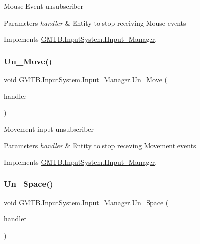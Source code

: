 Mouse Event unsubscriber 


\begin{DoxyParams}{Parameters}
{\em handler} & Entity to stop receiving Mouse events \\
\hline
\end{DoxyParams}


Implements \mbox{\hyperlink{interface_g_m_t_b_1_1_input_system_1_1_i_input___manager_aef09d69d61e15351f0eabd51b61157c3}{G\+M\+T\+B.\+Input\+System.\+I\+Input\+\_\+\+Manager}}.

\mbox{\label{class_g_m_t_b_1_1_input_system_1_1_input___manager_a4ee9e098443b0a1299f3f0360d0fb3e6}} 
\subsubsection{\texorpdfstring{Un\_Move()}{Un\_Move()}}
{\footnotesize\ttfamily void G\+M\+T\+B.\+Input\+System.\+Input\+\_\+\+Manager.\+Un\+\_\+\+Move (\begin{DoxyParamCaption}\item[{Event\+Handler$<$ \mbox{\hyperlink{class_g_m_t_b_1_1_input_system_1_1_input_event}{Input\+Event}} $>$}]{handler }\end{DoxyParamCaption})}



Movement input unsubscriber 


\begin{DoxyParams}{Parameters}
{\em handler} & Entity to stop receving Movement events\\
\hline
\end{DoxyParams}


Implements \mbox{\hyperlink{interface_g_m_t_b_1_1_input_system_1_1_i_input___manager_a7b2ca99e2877562ead23aa209162f08b}{G\+M\+T\+B.\+Input\+System.\+I\+Input\+\_\+\+Manager}}.

\mbox{\label{class_g_m_t_b_1_1_input_system_1_1_input___manager_a6d9a4033204bd3c03faa7e86c67e0ed2}} 
\subsubsection{\texorpdfstring{Un\_Space()}{Un\_Space()}}
{\footnotesize\ttfamily void G\+M\+T\+B.\+Input\+System.\+Input\+\_\+\+Manager.\+Un\+\_\+\+Space (\begin{DoxyParamCaption}\item[{Event\+Handler$<$ \mbox{\hyperlink{class_g_m_t_b_1_1_input_system_1_1_input_event}{Input\+Event}} $>$}]{handler }\end{DoxyParamCaption})}



